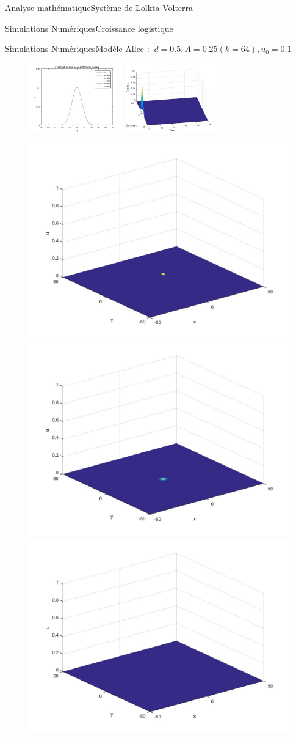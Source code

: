 \documentclass[10pt]{beamer}
\begin{document}
\begin{frame}{Analyse mathématique}{Système de Lolkta Volterra}
\end{frame}

\begin{frame}{Simulations Numériques}{Croissance logistique}
\end{frame}

\begin{frame}{Simulations Numériques}{Modèle Allee : $\ d=0.5, A=0.25 (k=64), u_0=0.1$}
\begin{figure}[H]
	\centering
	\includegraphics[width=0.40\linewidth, height=3cm]{Allee/F2311}\hfill
	\includegraphics[width=0.55\linewidth, height=3cm]{Allee/F4311}
\end{figure}
\begin{figure}[H]
	\centering
	\includegraphics[width=0.3\linewidth]{Allee/311__1_}\hfill
    \includegraphics[width=0.3\linewidth]{Allee/311__2_}\hfill
	\includegraphics[width=0.3\linewidth]{Allee/311__3_}
\end{figure}
\end{frame}
\end{document}

